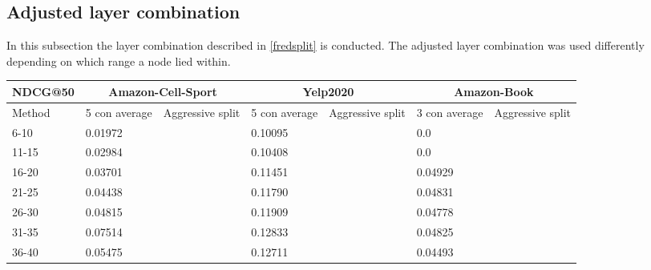 \subsection{Adjusted layer combination}\label{app:adjusted-layer-combi}
In this subsection the layer combination described in \autoref{fredsplit} is conducted.
The adjusted layer combination was used differently depending on which range a node lied within.

\begin{table*}[h!]
    \centering
    \begin{tabular}{|l|l|l||l|l||l|l|}
        \hline
        NDCG@50   & \multicolumn{2}{c||}{Amazon-Cell-Sport} & \multicolumn{2}{c||}{Yelp2020} & \multicolumn{2}{c|}{Amazon-Book}                                                       \\ \hline
        Method    & 5 con average                           & Aggressive split               & 5 con average                    & Aggressive split & 3 con average & Aggressive split \\ \hline
        6-10      & 0.01972                                 &                                & 0.10095                          &                  & 0.0           &                  \\ \hline
        11-15     & 0.02984                                 &                                & 0.10408                          &                  & 0.0           &                  \\ \hline
        16-20     & 0.03701                                 &                                & 0.11451                          &                  & 0.04929       &                  \\ \hline
        21-25     & 0.04438                                 &                                & 0.11790                          &                  & 0.04831       &                  \\ \hline
        26-30     & 0.04815                                 &                                & 0.11909                          &                  & 0.04778       &                  \\ \hline
        31-35     & 0.07514                                 &                                & 0.12833                          &                  & 0.04825       &                  \\ \hline
        36-40     & 0.05475                                 &                                & 0.12711                          &                  & 0.04493       &                  \\ \hline

\end{tabular}
\end{table*}
